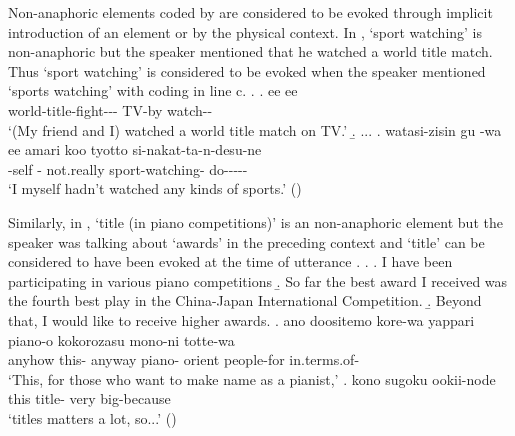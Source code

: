 
Non-anaphoric elements coded by  are considered to be evoked
through implicit introduction of an element or by the physical context.
In \Next,
 `sport watching' is non-anaphoric
but the speaker mentioned that he watched a world title match.
Thus `sport watching' is considered to be evoked
when the speaker mentioned `sports watching' with  coding in line c.
%
\ex. \ag. ee  ee   \\
		 world-title-fight---  TV-by watch-- \\
		`(My friend and I) watched a world title match on TV.'
	\b. ...
	\bg. watasi-zisin gu -wa ee amari koo  tyotto si-nakat-ta-n-desu-ne \\
		-self  -  not.really  sport-watching-  do----- \\
		`I myself hadn't watched any kinds of sports.' \hfill{()}
%	

Similarly, in \Next,
 `title (in piano competitions)' is an non-anaphoric element
but the speaker was talking about `awards' in the preceding context
and `title' can be considered to have been evoked at the time of utterance \Next[e].
%
\ex. \a. I have been participating in various piano competitions
	\b. So far the best award I received was the fourth best play in the China-Japan International Competition.
	\b. Beyond that, I would like to receive higher awards.
	\bg. ano doositemo kore-wa yappari piano-o kokorozasu mono-ni totte-wa \\
		 anyhow this- anyway piano- orient people-for in.terms.of- \\
		`This, for those who want to make name as a pianist,'
	\bg. kono  sugoku ookii-node \\
		this title- very big-because \\
		`titles matters a lot, so...'
\hfill{()}
%

